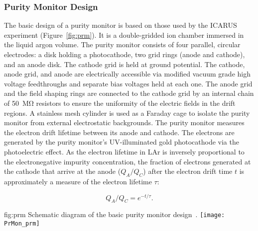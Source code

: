 \subsubsection{Purity Monitor Design}

The basic design of a purity monitor is based on those used by the ICARUS experiment (Figure~\ref{fig:prm})\cite{Adamowski:2014daa}. It is a double-gridded ion chamber immersed in the liquid argon volume.   The purity monitor consists of four parallel, circular electrodes: a disk holding a photocathode, two grid rings (anode and cathode), and an anode disk. The cathode grid is held at ground potential. The cathode, anode grid, and anode are electrically accessible via modified vacuum grade high voltage feedthroughs and separate bias voltages held at each one.  The anode grid and the field shaping rings are connected to the cathode grid by an internal chain of \SI{50}{\mega\ohm} resistors to ensure the uniformity of the electric fields in the drift regions. A stainless mesh cylinder is used as a Faraday cage to isolate the purity monitor from external electrostatic backgrounds. The purity monitor measures the electron drift lifetime between its anode and cathode. The electrons are generated by the purity monitor's UV-illuminated gold photocathode via the photoelectric effect. As the electron lifetime in LAr is inversely proportional to the electronegative impurity concentration, the fraction of electrons generated at the cathode that arrive at the anode ($Q_A/Q_C$) after the electron drift time $t$ is approximately a measure of the electron lifetime $\tau$: 

$$ Q_A/Q_C=e^{-t/\tau}. $$

\begin{dunefigure}{fig:prm}
  {Schematic diagram of the basic purity monitor design~\cite{Adamowski:2014daa}.}
  \texttt{[image: PrMon\_prm]}
\end{dunefigure}

